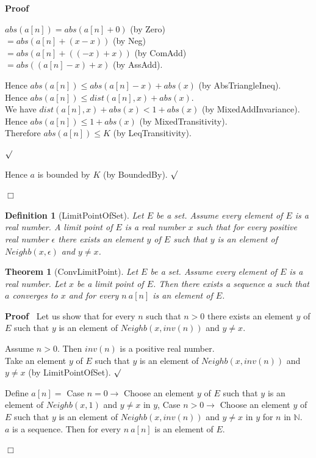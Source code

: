 \documentclass{article}
\newenvironment{forthel}{\begin{leftbar}}{\end{leftbar}}
\newenvironment{proof}{\noindent\textbf{Proof\ }}{\hspace*{\fill}$\Box$\medskip}
\newenvironment{subproof}{\begin{list}{}{}
		\item[\text{Proof}]}{\hfill $\surd$ \end{list}}
\newenvironment{case}{\begin{list}{}{}
		\item[]}{\end{list}}
\newtheorem{theorem}{Theorem}
\newtheorem{definition}{Definition}
\newcommand{\NN}{\mathbb{N}}
\newcommand{\dotequal}{=}
\begin{document}
\begin{forthel}
\begin{proof}
\begin{subproof}
\begin{subproof}
\begin{case}
					$abs(a[n]) \dotequal abs(a[n] + 0)$ (by Zero)\\
					$\dotequal abs(a[n] + (x - x))$ (by Neg)\\
					$\dotequal abs(a[n] + ((-x) + x))$ (by ComAdd)\\
					$\dotequal abs((a[n] - x) + x)$ (by AssAdd).
					
					Hence $abs(a[n]) \leq abs(a[n] - x) + abs(x)$ (by AbsTriangleIneq).\\
					Hence $abs(a[n]) \leq dist(a[n],x) + abs(x)$.\\
					We have $dist(a[n],x) + abs(x) < 1 + abs(x)$ (by MixedAddInvariance).\\
					Hence $abs(a[n]) \leq 1 + abs(x)$ (by MixedTransitivity).\\
					Therefore $abs(a[n]) \leq K$ (by LeqTransitivity).
				\end{case}
			\end{subproof}
			Hence $a$ is bounded by $K$ (by BoundedBy).
		\end{subproof}
	\end{proof}
	
	\begin{definition}[LimitPointOfSet]
		Let $E$ be a set. Assume every element of $E$ is a real number. A limit point of $E$
		is a real number $x$ such that for every positive real number $\epsilon$ there exists an element
		$y$ of $E$ such that $y$ is an element of $Neighb(x,\epsilon)$ and $y \neq x$.
	\end{definition}
	
	\begin{theorem}[ConvLimitPoint]
		Let $E$ be a set. Assume every element of $E$ is a real number. Let $x$ be a limit point of $E$.
		Then there exists a sequence $a$ such that $a$ converges to $x$ and for every $n \ a[n]$ is an element of $E$.
	\end{theorem}

	\begin{proof}
		Let us show that for every $n$ such that $n > 0$ there exists an element $y$ of $E$ such that
		$y$ is an element of $Neighb(x,inv(n))$ and $y \neq x$.
		\begin{subproof}
			Assume $n > 0$.
			Then $inv(n)$ is a positive real number.\\
			Take an element $y$ of $E$ such that $y$ is an element of $Neighb(x,inv(n))$
			and $y \neq x$ (by LimitPointOfSet).
		\end{subproof}
	
		\noindent Define $a[n] =$ Case $n = 0 \rightarrow$ Choose an element $y$ of $E$ such that $y$ is an element of
		$Neighb(x,1)$ and $y \neq x$ in $y$,
		Case $n > 0 \rightarrow$ Choose an element $y$ of $E$ such that $y$ is an element of
		$Neighb(x,inv(n))$ and $y \neq x$ in $y$
		for $n$ in $\NN$.\\
		$a$ is a sequence.	
		Then for every $n \ a[n]$ is an element of $E$.
		

\end{proof}
\end{forthel}
\end{document}
